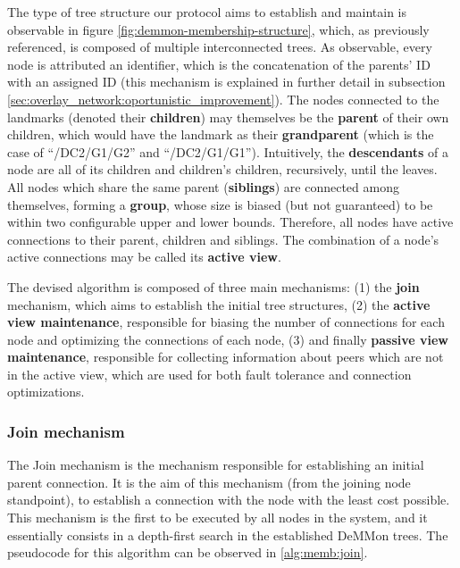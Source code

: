 The type of tree structure our protocol aims to establish and maintain is observable in figure \ref{fig:demmon-membership-structure}, which, as previously referenced, is composed of multiple interconnected trees. As observable, every node is attributed an identifier, which is the concatenation of the parents' ID with an assigned ID (this mechanism is explained in further detail in subsection \ref{sec:overlay_network:oportunistic_improvement}). The nodes connected to the landmarks (denoted their \textbf{children}) may themselves be the \textbf{parent} of their own children, which would have the landmark as their \textbf{grandparent} (which is the case of ``/DC2/G1/G2'' and ``/DC2/G1/G1''). Intuitively, the \textbf{descendants} of a node are all of its children and children's children, recursively, until the leaves. All nodes which share the same parent (\textbf{siblings}) are connected among themselves, forming a \textbf{group}, whose size is biased (but not guaranteed) to be within two configurable upper and lower bounds. Therefore, all nodes have active connections to their parent, children and siblings. The combination of a node's active connections may be called its \textbf{active view}. 

The devised algorithm is composed of three main mechanisms: (1) the \textbf{join} mechanism, which aims to establish the initial tree structures, (2) the \textbf{active view maintenance}, responsible for biasing the number of connections for each node and optimizing the connections of each node, (3)  and finally \textbf{passive view maintenance}, responsible for collecting information about peers which are not in the active view, which are used for both fault tolerance and connection optimizations.

\subsubsection{Join mechanism} \label{sec:overlay_network:join}

The Join mechanism is the mechanism responsible for establishing an initial parent connection. It is the aim of this mechanism (from the joining node standpoint), to establish a connection with the node with the least cost possible. This mechanism is the first to be executed by all nodes in the system, and it essentially consists in a depth-first search in the established DeMMon trees. The pseudocode for this algorithm can be observed in \ref{alg:memb:join}. 



